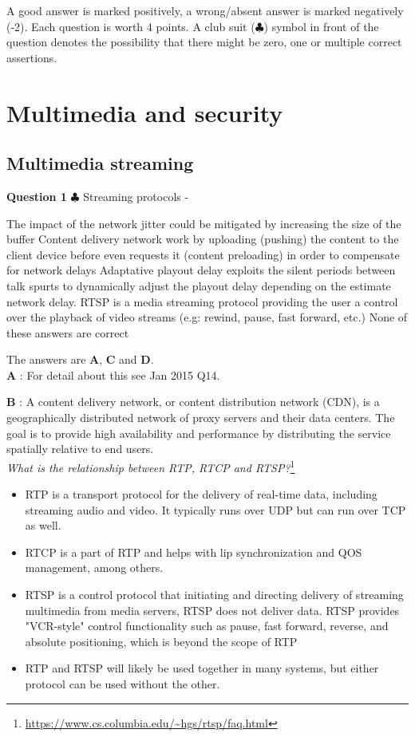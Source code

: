 \documentclass[en]{sourcefiles/eplexam}
\newcounter{choice}
\renewcommand\thechoice{\textbf{\Alph{choice}}}
\newcommand\choicelabel{\thechoice$\quad$}
\newenvironment{choices}%
  {\list{\choicelabel}%
     {\usecounter{choice}\def\makelabel##1{\hss\llap{##1}}%
       \settowidth{\leftmargin}{W.\hskip\labelsep\hskip 2.5em}%
       \def\choice{%
         \item
       } %
       \labelwidth\leftmargin\advance\labelwidth-\labelsep
       \topsep=0pt
       \partopsep=0pt
     }%
  }%
  {\endlist}
\begin{document}
\noindent A good answer is marked positively, a wrong/absent answer is marked negatively (-2). Each question is worth 4 points. A club suit ($\clubsuit$) symbol in front of the question denotes the possibility that there might be zero, one or multiple correct assertions. 
\section{Multimedia and security}
\subsection{Multimedia streaming}
\textbf{Question 1} $\clubsuit$ Streaming protocols 
\begin{choices}
     \choice The impact of the network jitter could be mitigated by increasing the size of the buffer
     \choice Content delivery network work by uploading (pushing) the content to the client device before even requests it (content preloading) in order to compensate for network delays
     \choice Adaptative playout delay exploits the silent periods between talk spurts to dynamically adjust the playout delay depending on the estimate network delay.
     \choice RTSP is a media streaming protocol providing the user a control over the playback of video streams (e.g: rewind, pause, fast forward, etc.)
     \choice None of these answers are correct
\end{choices}
\begin{solution}
The answers are \textbf{A}, \textbf{C} and \textbf{D}.\\

\noindent \textbf{A} : For detail about this see Jan 2015 Q14.

\noindent \textbf{B} : A content delivery network, or content distribution network (CDN), is a geographically distributed network of proxy servers and their data centers. The goal is to provide high availability and performance by distributing the service spatially relative to end users.\\

\noindent \textit{What is the relationship between RTP, RTCP and RTSP?}\footnote{\url{https://www.cs.columbia.edu/~hgs/rtsp/faq.html}}
\begin{itemize}
    \item RTP is a transport protocol for the delivery of real-time data, including streaming audio and video. It typically runs over UDP but can run over TCP as well.
    \item RTCP is a part of RTP and helps with lip synchronization and QOS management, among others.
    \item RTSP is a control protocol that initiating and directing delivery of streaming multimedia from media servers,  RTSP does not deliver data. RTSP provides "VCR-style" control functionality such as pause, fast forward, reverse, and absolute positioning, which is beyond the scope of RTP
    \item  RTP and RTSP will likely be used together in many systems, but either protocol can be used without the other.
\end{itemize}


\end{solution}
\end{document}
